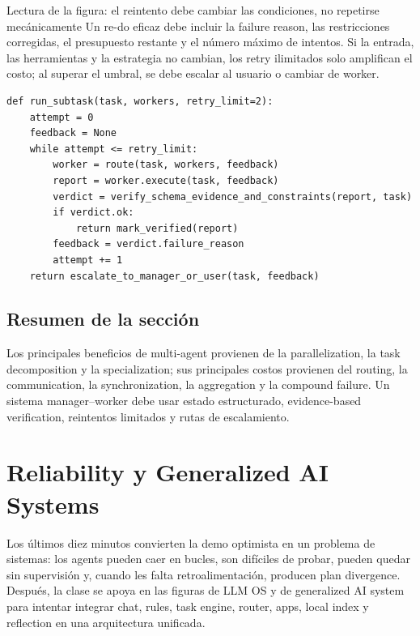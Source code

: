 \documentclass[a4paper]{article}
\begin{document}
\begin{knowledgebox}{Lectura de la figura: el reintento debe cambiar las condiciones, no repetirse mecánicamente}
Un re-do eficaz debe incluir la failure reason, las restricciones corregidas, el presupuesto restante y el número máximo de intentos. Si la entrada, las herramientas y la estrategia no cambian, los retry ilimitados solo amplifican el costo; al superar el umbral, se debe escalar al usuario o cambiar de worker.
\end{knowledgebox}

\begin{lstlisting}[caption={Protocolo manager--worker con verificación y reintentos limitados}]
def run_subtask(task, workers, retry_limit=2):
    attempt = 0
    feedback = None
    while attempt <= retry_limit:
        worker = route(task, workers, feedback)
        report = worker.execute(task, feedback)
        verdict = verify_schema_evidence_and_constraints(report, task)
        if verdict.ok:
            return mark_verified(report)
        feedback = verdict.failure_reason
        attempt += 1
    return escalate_to_manager_or_user(task, feedback)
\end{lstlisting}


\subsection{Resumen de la sección}

Los principales beneficios de multi-agent provienen de la parallelization, la task decomposition y la specialization; sus principales costos provienen del routing, la communication, la synchronization, la aggregation y la compound failure. Un sistema manager--worker debe usar estado estructurado, evidence-based verification, reintentos limitados y rutas de escalamiento.
\section{Reliability y Generalized AI Systems}

Los últimos diez minutos convierten la demo optimista en un problema de sistemas: los agents pueden caer en bucles, son difíciles de probar, pueden quedar sin supervisión y, cuando les falta retroalimentación, producen plan divergence. Después, la clase se apoya en las figuras de LLM OS y de generalized AI system para intentar integrar chat, rules, task engine, router, apps, local index y reflection en una arquitectura unificada.
\end{document}
